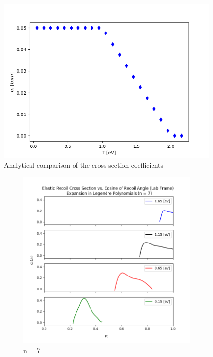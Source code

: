 \documentclass[review]{elsarticle}
\begin{document}
\begin{figure}
	\centering
	\includegraphics[width=0.5\linewidth]{erxs_analytical}
	\caption{Analytical comparison of the cross section coefficients }
	\label{fig:analytical}
\end{figure}

\begin{figure}
	\begin{subfigure}[h]{0.5\linewidth}
		\includegraphics[width=\linewidth]{H_simple_plot_l7}
		\caption{n = 7}
		\label{fig:legendre7}
	\end{subfigure}
	\hfill
	\begin{subfigure}[h]{0.5\linewidth}

\end{subfigure}
\end{figure}
\end{document}
